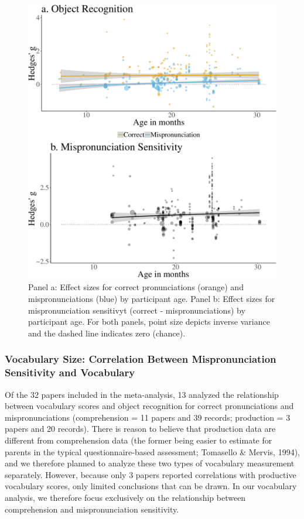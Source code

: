 \documentclass[man]{apa6}
\theoremstyle{definition}
\theoremstyle{definition}
\theoremstyle{definition}
\theoremstyle{remark}
\begin{document}
\begin{figure}
\centering
\includegraphics{Paper_Analyses_files/figure-latex/PlotMPEffect-1.pdf}
\caption{\label{fig:PlotMPEffect}Panel a: Effect sizes for correct
pronunciations (orange) and mispronunciations (blue) by participant age.
Panel b: Effect sizes for mispronunciation sensitivyt (correct -
mispronunciations) by participant age. For both panels, point size
depicts inverse variance and the dashed line indicates zero (chance).}
\end{figure}

\subsubsection{Vocabulary Size: Correlation Between Mispronunciation
Sensitivity and
Vocabulary}\label{vocabulary-size-correlation-between-mispronunciation-sensitivity-and-vocabulary}

Of the 32 papers included in the meta-analysis, 13 analyzed the
relationship between vocabulary scores and object recognition for
correct pronunciations and mispronunciations (comprehension = 11 papers
and 39 records; production = 3 papers and 20 records). There is reason
to believe that production data are different from comprehension data
(the former being easier to estimate for parents in the typical
questionnaire-based assessment; Tomasello \& Mervis, 1994), and we
therefore planned to analyze these two types of vocabulary measurement
separately. However, because only 3 papers reported correlations with
productive vocabulary scores, only limited conclusions that can be
drawn. In our vocabulary analysis, we therefore focus exclusively on the
relationship between comprehension and mispronunciation sensitivity.
\end{document}
